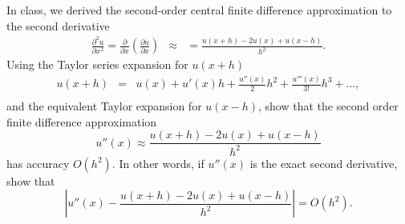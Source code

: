 In class, we derived the second-order central finite difference approximation to the second derivative 
\begin{eqnarray*}
\frac{\partial^2 u}{\partial x^2} = \frac{\partial }{\partial x} \left(\frac{\partial u}{\partial x}\right)&\approx &= \frac{u(x+h)-2u(x) + u(x-h)}{h^2}.
\end{eqnarray*} 
Using the Taylor series expansion for $u(x+h)$ 
\begin{eqnarray*}
u(x+h) &=& u(x) + u'(x)h + \frac{u''(x)}{2}h^2 + \frac{u'''(x)}{3!}h^3 + \ldots,\\
\end{eqnarray*}
and the equivalent Taylor expansion for $u(x-h)$, show that the second order finite difference approximation
\[
u''(x) \approx \frac{u(x+h)-2u(x) + u(x-h)}{h^2}
\]
has accuracy $O(h^2)$.  In other words, if $u''(x)$ is the exact second derivative, show that 
\[
\left| u''(x) - \frac{u(x+h)-2u(x) + u(x-h)}{h^2}\right| = O(h^2).
\]



